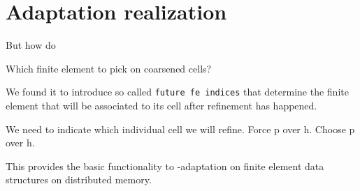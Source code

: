 \section{Adaptation realization}
\label{sec:adaptation}


But how do

Which finite element to pick on coarsened cells?

We found it to introduce so called \texttt{future fe indices} that determine the finite element that will be associated to its cell after refinement has happened.

We need to indicate which individual cell we will refine. Force p over h. Choose p over h.

This provides the basic functionality to \hp-adaptation on finite element data structures on distributed memory.